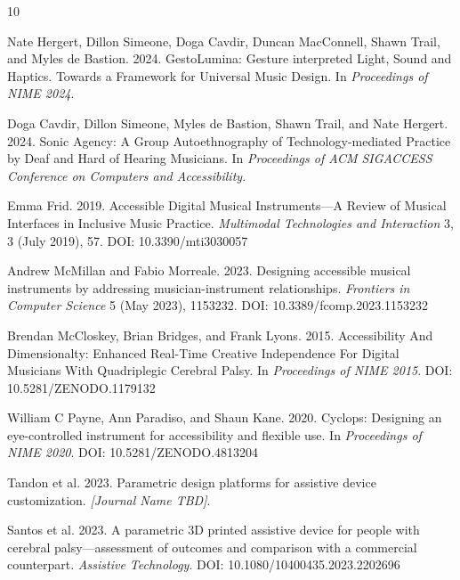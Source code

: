 \documentclass[sigconf]{nimeart}
\begin{document}

\begin{thebibliography}{10}


Nate Hergert, Dillon Simeone, Doga Cavdir, Duncan MacConnell, Shawn Trail, and Myles de Bastion. 2024.
GestoLumina: Gesture interpreted Light, Sound and Haptics. Towards a Framework for Universal Music Design.
In \textit{Proceedings of NIME 2024}.

Doga Cavdir, Dillon Simeone, Myles de Bastion, Shawn Trail, and Nate Hergert. 2024.
Sonic Agency: A Group Autoethnography of Technology-mediated Practice by Deaf and Hard of Hearing Musicians.
In \textit{Proceedings of ACM SIGACCESS Conference on Computers and Accessibility}.

Emma Frid. 2019.
Accessible Digital Musical Instruments—A Review of Musical Interfaces in Inclusive Music Practice.
\textit{Multimodal Technologies and Interaction} 3, 3 (July 2019), 57.
DOI: 10.3390/mti3030057

Andrew McMillan and Fabio Morreale. 2023.
Designing accessible musical instruments by addressing musician-instrument relationships.
\textit{Frontiers in Computer Science} 5 (May 2023), 1153232.
DOI: 10.3389/fcomp.2023.1153232

Brendan McCloskey, Brian Bridges, and Frank Lyons. 2015.
Accessibility And Dimensionalty: Enhanced Real-Time Creative Independence For Digital Musicians With Quadriplegic Cerebral Palsy.
In \textit{Proceedings of NIME 2015}.
DOI: 10.5281/ZENODO.1179132

William C Payne, Ann Paradiso, and Shaun Kane. 2020.
Cyclops: Designing an eye-controlled instrument for accessibility and flexible use.
In \textit{Proceedings of NIME 2020}.
DOI: 10.5281/ZENODO.4813204

Tandon et al. 2023.
Parametric design platforms for assistive device customization.
\textit{[Journal Name TBD]}.

Santos et al. 2023.
A parametric 3D printed assistive device for people with cerebral palsy—assessment of outcomes and comparison with a commercial counterpart.
\textit{Assistive Technology}.
DOI: 10.1080/10400435.2023.2202696


\end{thebibliography}
\end{document}

